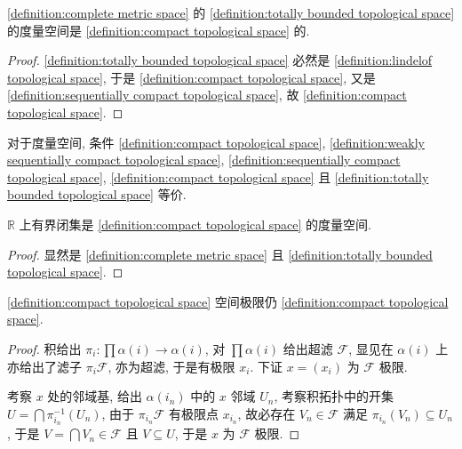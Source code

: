 \begin{lemma}
    \ref{definition:complete metric space} 的 \ref{definition:totally bounded topological space} 的度量空间是 \ref{definition:compact topological space} 的.

    \begin{proof}
        \ref{definition:totally bounded topological space} 必然是 \ref{definition:lindelof topological space}, 于是 \ref{definition:compact topological space},
        又是 \ref{definition:sequentially compact topological space}, 故 \ref{definition:compact topological space}.
    \end{proof}
\end{lemma}

\begin{corollary}
    对于度量空间, 条件 \ref{definition:compact topological space}, \ref{definition:weakly sequentially compact topological space}, \ref{definition:sequentially compact topological space}, 
    \ref{definition:compact topological space} 且 \ref{definition:totally bounded topological space} 等价.
\end{corollary}

\begin{corollary}
    \(\mathbb{R}\) 上有界闭集是 \ref{definition:compact topological space} 的度量空间.

    \begin{proof}
        显然是 \ref{definition:complete metric space} 且 \ref{definition:totally bounded topological space}.
    \end{proof}
\end{corollary}

\begin{theorem}[Tychonoff]
    \label {theorem:tychonoff's theorem}
    \ref{definition:compact topological space} 空间极限仍 \ref{definition:compact topological space}.

    \begin{proof}
        积给出 \(\pi_i : \prod \alpha(i) \to \alpha(i)\), 对 \(\prod \alpha(i)\) 给出超滤 \(\mathcal{F}\),
        显见在 \(\alpha(i)\) 上亦给出了滤子 \(\pi_i \mathcal{F}\), 亦为超滤, 于是有极限 \(x_i\). 下证 \(x = (x_i)\) 为 \(\mathcal{F}\) 极限.

        考察 \(x\) 处的邻域基, 给出 \(\alpha (i_n)\) 中的 \(x\) 邻域 \(U_n\), 考察积拓扑中的开集 \(U = \bigcap \pi_{i_n}^{-1} (U_n)\),
        由于 \(\pi_{i_n} \mathcal{F}\) 有极限点 \(x_{i_n}\), 故必存在 \(V_n \in \mathcal{F}\) 满足 \(\pi_{i_n} (V_n) \subseteq U_n\), 于是 \(V = \bigcap V_n \in \mathcal{F}\)
        且 \(V \subseteq U\), 于是 \(x\) 为 \(\mathcal{F}\) 极限.
    \end{proof}
\end{theorem}

